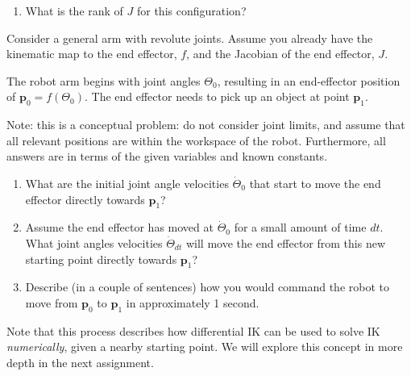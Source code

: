 \documentclass{16384_doc}
\begin{document}
\begin{questions}
\begin{enumerate} [label=\alph*.]
        \item \text{[1 point]} What is the rank of $J$ for this configuration?
        \begin{tcolorbox}[height=3cm]
        \end{tcolorbox}
        
    \end{enumerate}


    Consider a general arm with revolute joints. Assume you already have the
    kinematic map to the end effector, $f$, and the Jacobian of the end
    effector, $J$.

    The robot arm begins with joint angles $\Theta_0$, resulting in an
    end-effector position of $\mathbf{p}_0 = f(\Theta_0)$.  The end effector
    needs to pick up an object at point $\mathbf{p}_1$.

    Note: this is a conceptual problem: do not consider joint limits, and
    assume that all relevant positions are within the workspace of the robot.
    Furthermore, all answers are in terms of the given variables and known
    constants.
    
    \begin{enumerate} [label=\alph*.]
        \item \text{[2 points]} What are the initial joint angle velocities $\dot{\Theta}_0$ that
      start to move the end effector directly towards $\mathbf{p}_1$?
      \begin{tcolorbox}[height=3cm]
        \end{tcolorbox}
        
        \item \text{[3 points]} Assume the end effector has moved at $\dot{\Theta}_0$ for a small
      amount of time $dt$.  What joint angles velocities $\dot{\Theta}_{dt}$
      will move the end effector from this new starting point directly towards
      $\mathbf{p}_1$?
      \begin{tcolorbox}[height=3cm]
        \end{tcolorbox}
        
        \item \text{[2 points]} Describe (in a couple of sentences) how you would command the
      robot to move from $\mathbf{p}_0$ to $\mathbf{p}_1$ in approximately 1
      second.
      \begin{tcolorbox}[height=3cm]
        \end{tcolorbox}
        
    \end{enumerate}

    Note that this process describes how differential IK can be used to solve
    IK \emph{numerically}, given a nearby starting point.  We will explore this
    concept in more depth in the next assignment.

\end{questions}
\end{document}

